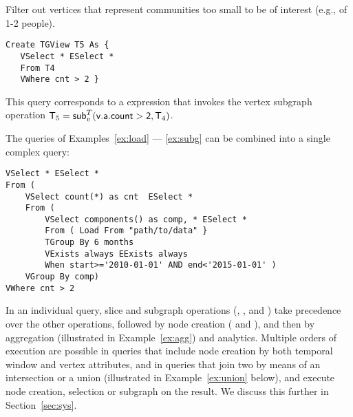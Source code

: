 
\begin{example}
\label{ex:subg}

Filter out vertices that represent communities too small to be of
interest (e.g., of 1-2 people).  

\begin{small} 
\begin{verbatim}
Create TGView T5 As {
   VSelect * ESelect *
   From T4
   VWhere cnt > 2 }
\end{verbatim}
\end{small}

This query corresponds to a \tra expression that invokes the vertex
subgraph operation $\mathsf{T}_5 = \textsf{sub}^T_v(\mathsf{v.a.count > 2},\mathsf{T}_4)$.

\end{example}

The queries of Examples~\ref{ex:load} --- \ref{ex:subg} can be
combined into a single complex query:

\begin{small}
\begin{verbatim}
VSelect * ESelect *
From (
    VSelect count(*) as cnt  ESelect *
    From (
        VSelect components() as comp, * ESelect *
        From ( Load From "path/to/data" }
        TGroup By 6 months
        VExists always EExists always
        When start>='2010-01-01' AND end<'2015-01-01' )
    VGroup By comp)
VWhere cnt > 2 
\end{verbatim}
\end{small}

In an individual \ql query, slice and subgraph operations
(, , and ) take precedence
over the other operations, followed by node creation (
and ), and then by aggregation (illustrated in
Example~\ref{ex:agg}) and analytics.  Multiple orders of execution are
possible in queries that include node creation by both temporal window
and vertex attributes, and in queries that join two \tgs by means of
an intersection or a union (illustrated in Example~\ref{ex:union}
below), and execute node creation, selection or subgraph on the
result.  We discuss this further in Section~\ref{sec:sys}.


